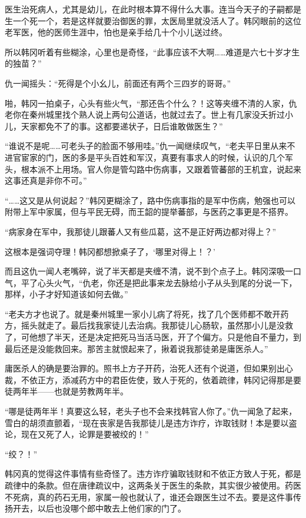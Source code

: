 医生治死病人，尤其是幼儿，在此时根本算不得什么大事。连当今天子的子嗣都是生一个死一个，若是这样就要治御医的罪，太医局里就没活人了。韩冈眼前的这位老军医，他的医师生涯中，怕也是亲手给几十个小儿送过终。

所以韩冈听着有些糊涂，心里也是奇怪，“此事应该不大啊……难道是六七十岁才生的独苗？”

仇一闻摇头：“死得是个小幺儿，前面还有两个三四岁的哥哥。”

啪，韩冈一拍桌子，心头有些火气，“那还告个什么？！这等夹缠不清的人家，仇老你在秦州城里找个熟人说上两句公道话，也就过去了。世上有几家没夭折过小儿，天家都免不了的事。这都要递状子，日后谁敢做医生？”

“谁说不是呢……可老头子的脸面不够用哇。”仇一闻继续叹气，“老夫平日里从来不进官宦家的门，医的多是平头百姓和军汉，真要有事求人的时候，认识的几个军头，根本派不上用场。官人你是管勾路中伤病事，又跟着管蕃部的王机宜，说起来这事还真是非你不可。”

“……这又是从何说起？”韩冈更糊涂了，路中伤病事指的是军中伤病，勉强也可以附带上军中家属，但与平民无碍，而王韶的提举蕃部，与医药之事更是不搭界。

“病家身在军中，我那徒儿跟蕃人又有些瓜葛，这不是正好两边都对得上？”

这根本是强词夺理！韩冈都想掀桌子了，‘哪里对得上！？’

而且这仇一闻人老嘴碎，说了半天都是夹缠不清，说不到个点子上。韩冈深吸一口气，平了心头火气，“仇老，你还是把此事来龙去脉给小子从头到尾的分说一下，那样，小子才好知道该如何去做。”

“老夫方才也说了。就是秦州城里一家小儿病了将死，找了几个医师都不敢开药方，摇头就走了。最后找我家徒儿去治病。我那徒儿心肠软，虽然那小儿是没救了，可他想了半天，还是决定把死马当活马医，开了个偏方。只是他自不量力，到最后还是没能救回来。那苦主就恨起来了，揪着说我那徒弟是庸医杀人。”

庸医杀人的确是要治罪的。照书上方子开药，治死人还有个说道，但如果别出心裁，不依正方，添减药方中的君臣佐使，致人于死的，依着疏律，韩冈记得那是要徒两年半——也就是劳教两年半。

“哪是徒两年半！真要这么轻，老头子也不会来找韩官人你了。”仇一闻急了起来，雪白的胡须直颤着，“现在丧家是告我那徒儿是违方诈疗，诈取钱财！本是要以盗论，现在又死了人，论罪是要被绞的！”

“绞？！”

韩冈真的觉得这件事情有些奇怪了。违方诈疗骗取钱财和不依正方致人于死，都是疏律中的条款。但在唐律疏议中，这两条关于医生的条款，其实很少被使用。药医不死病，真的药石无用，家属一般也就认了，谁还会跟医生过不去。要是这件事传扬开去，以后也没哪个郎中敢去上他们家的门了。

